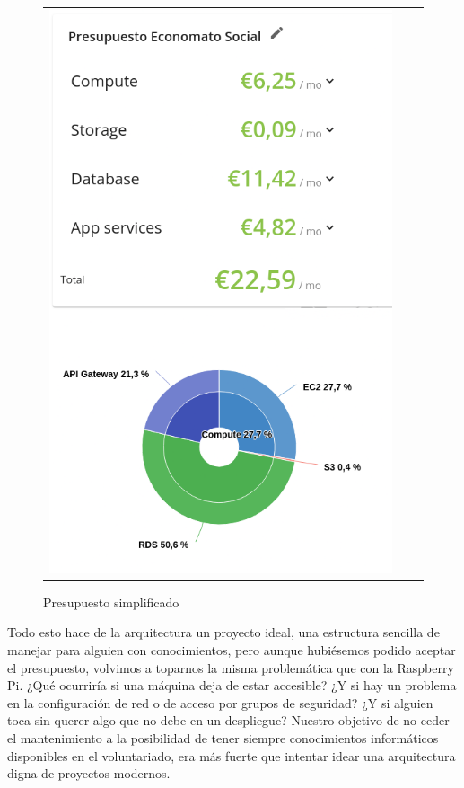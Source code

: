 \clearpage
\begin{figure}[h]
\centering
\begin{tabular}{ccc}
\includegraphics[scale=0.6]{archivos/budgetAws.png}
\end{tabular}
\caption{Presupuesto simplificado}
\end{figure}
\clearpage
\vspace{1em}
\par Todo esto hace de la arquitectura un proyecto ideal, una estructura sencilla de manejar para alguien con conocimientos, pero aunque hubiésemos podido aceptar el presupuesto, volvimos a toparnos la misma problemática que con la Raspberry Pi. ¿Qué ocurriría si una máquina deja de estar accesible? ¿Y si hay un problema en la configuración de red o de acceso por grupos de seguridad? ¿Y si alguien toca sin querer algo que no debe en un despliegue? Nuestro objetivo de no ceder el mantenimiento a la posibilidad de tener siempre conocimientos informáticos disponibles en el voluntariado, era más fuerte que intentar idear una arquitectura digna de proyectos modernos.
